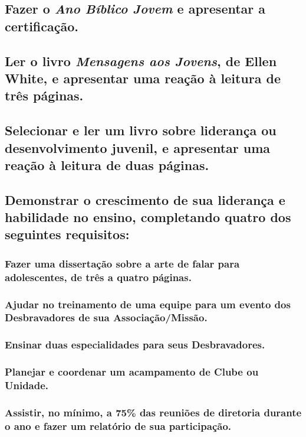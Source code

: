 \subsection{Fazer o \emph{Ano Bíblico Jovem} e apresentar a certificação.}

\subsection{Ler o livro \emph{Mensagens aos Jovens}, de Ellen White, e apresentar uma reação à leitura de três páginas.}

\subsection{Selecionar e ler um livro sobre liderança ou desenvolvimento juvenil, e apresentar uma reação à leitura de duas páginas.}

\subsection{Demonstrar o crescimento de sua liderança e habilidade no ensino, completando quatro dos seguintes requisitos:}

\subsubsection{Fazer uma dissertação sobre a arte de falar para adolescentes, de três a quatro páginas.}

\subsubsection{Ajudar no treinamento de uma equipe para um evento dos Desbravadores de sua Associação/Missão.}

\subsubsection{Ensinar duas especialidades para seus Desbravadores.}

\subsubsection{Planejar e coordenar um acampamento de Clube ou Unidade.}

\subsubsection{Assistir, no mínimo, a 75\% das reuniões de diretoria durante o ano e fazer um relatório de sua participação.}


